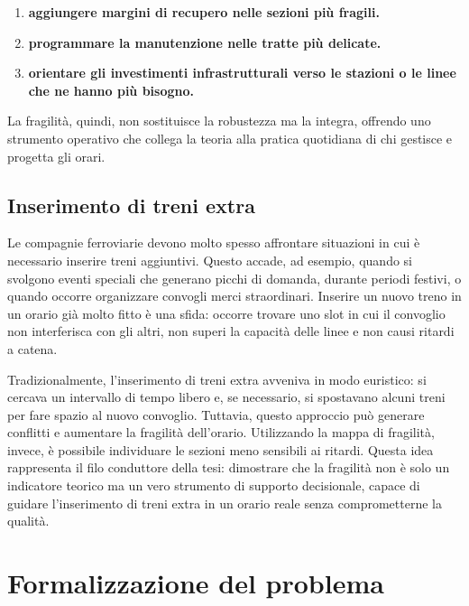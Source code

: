 \documentclass[a4paper,12pt]{report}
\begin{document}
\begin{enumerate}
    \item \textbf{aggiungere margini di recupero nelle sezioni più fragili.}

    \item \textbf{programmare la manutenzione nelle tratte più delicate.}

    \item \textbf{orientare gli investimenti infrastrutturali verso le stazioni o le linee che ne hanno più bisogno.}
    
    \end{enumerate}
    
La fragilità, quindi, non sostituisce la robustezza ma la integra, offrendo uno strumento operativo che collega la teoria alla pratica quotidiana di chi gestisce e progetta gli orari.



\section{Inserimento di treni extra}
Le compagnie ferroviarie devono molto spesso affrontare situazioni in cui è necessario inserire treni aggiuntivi. Questo accade, ad esempio, quando si svolgono eventi speciali che generano picchi di domanda, durante periodi festivi, o quando occorre organizzare convogli merci straordinari. Inserire un nuovo treno in un orario già molto fitto è una sfida: occorre trovare uno slot in cui il convoglio non interferisca con gli altri, non superi la capacità delle linee e non causi ritardi a catena.

Tradizionalmente, l’inserimento di treni extra avveniva in modo euristico: si cercava un intervallo di tempo libero e, se necessario, si spostavano alcuni treni per fare spazio al nuovo convoglio. Tuttavia, questo approccio può generare conflitti e aumentare la fragilità dell’orario. Utilizzando la mappa di fragilità, invece, è possibile individuare le sezioni meno sensibili ai ritardi.
Questa idea rappresenta il filo conduttore della tesi: dimostrare che la fragilità non è solo un indicatore teorico ma un vero strumento di supporto decisionale, capace di guidare l’inserimento di treni extra in un orario reale senza comprometterne la qualità.

\chapter{Formalizzazione del problema}
\end{document}
